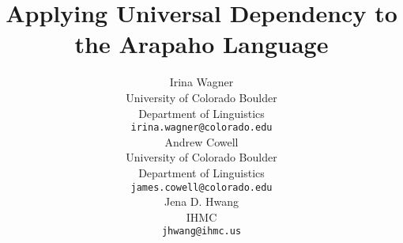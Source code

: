 \documentclass[11pt]{article}
\title{Applying Universal Dependency to the Arapaho Language}
\author{Irina Wagner\\
  University of Colorado Boulder\\
  Department of Linguistics\\
  {\tt irina.wagner@colorado.edu} \\\And
  Andrew Cowell \\
  University of Colorado Boulder \\
  Department of Linguistics \\
  {\tt james.cowell@colorado.edu} \\ 
  \And
  Jena D. Hwang\\
  IHMC\\
  {\tt jhwang@ihmc.us}}
\date{}
\begin{document}
\maketitle

\nocite{Marneffe2008,ud2014,Tsarfaty2013,Haverinen2014,Lipenkova2014,Nivre2015,Hajicova2015,Osborne2015,Cow08,Marneffe2014,McDonald2013,Goddard1984}  



\end{document}
